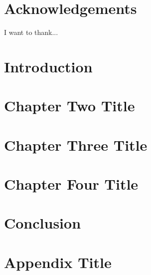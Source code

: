 \documentclass[12pt, twoside]{report}
\begin{document}


\chapter*{Acknowledgements}
I want to thank...

\tableofcontents

\listoffigures

\listoftables

\chapter{Introduction}


\chapter{Chapter Two Title}


\chapter{Chapter Three Title}


\chapter{Chapter Four Title}


\chapter{Conclusion}


\appendix
\chapter{Appendix Title}


\printbibliography
\end{document}
